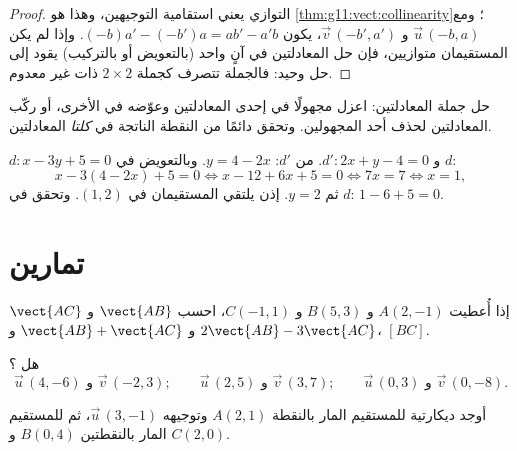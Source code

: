 \begin{proof}
التوازي يعني استقامية التوجيهين، وهذا هو
\cref{thm:g11:vect:collinearity}؛ ومع $\vec u\,(-b, a)$ و
$\vec v\,(-b', a')$، يكون  $(-b)a' - (-b')a = ab' - a'b$.
وإذا لم يكن المستقيمان متوازيين، فإن حل المعادلتين في آنٍ واحد
(بالتعويض أو بالتركيب) يقود إلى حل وحيد: فالجملة
تتصرف كجملة $2 \times 2$ ذات  غير معدوم.
\end{proof}

\begin{method}\label{met:g11:vect:intersection}
حل جملة المعادلتين: اعزل مجهولًا في إحدى المعادلتين
وعوّضه في الأخرى، أو ركّب المعادلتين لحذف أحد
المجهولين. وتحقق دائمًا من النقطة الناتجة في \emph{كلتا} المعادلتين.
\end{method}

\begin{example}\label{ex:g11:vect:intersection}
 $d: x - 3y + 5 = 0$ و $d': 2x + y - 4 = 0$. من $d'$:
$y = 4 - 2x$. وبالتعويض في $d$:
\[
x - 3(4 - 2x) + 5 = 0
\iff x - 12 + 6x + 5 = 0
\iff 7x = 7
\iff x = 1,
\]
ثم $y = 2$. إذن يلتقي المستقيمان في $(1, 2)$. وتحقق في $d$: $1 - 6 + 5 = 0$.
\end{example}

\section{تمارين}

\begin{exercise}[$\star$]\label{exo:g11:vect:1}
إذا أُعطيت $A(2, -1)$ و $B(5, 3)$ و $C(-1, 1)$، احسب 
$\vect{AB}$ و $\vect{AC}$ و $\vect{AB} + \vect{AC}$ و $2\vect{AB} -
3\vect{AC}$،  $[BC]$.
\end{exercise}

\begin{exercise}[$\star$]\label{exo:g11:vect:2}
هل ؟
\[
\vec u\,(4, -6) \text{ و } \vec v\,(-2, 3); \qquad
\vec u\,(2, 5) \text{ و } \vec v\,(3, 7); \qquad
\vec u\,(0, 3) \text{ و } \vec v\,(0, -8).
\]
\end{exercise}

\begin{exercise}[$\star$]\label{exo:g11:vect:3}
أوجد  ديكارتية للمستقيم المار بالنقطة $A(2, 1)$ وتوجيهه
$\vec u\,(3, -1)$، ثم للمستقيم المار بالنقطتين $B(0, 4)$ و
$C(2, 0)$.
\end{exercise}

